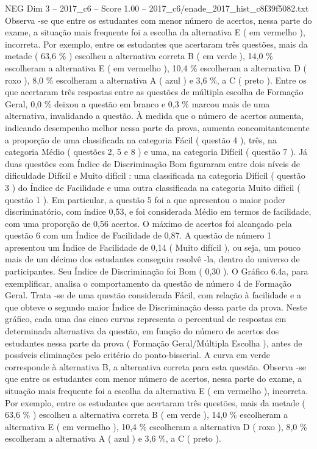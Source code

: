 \begin{textsample}{NEG Dim 3 – 2017\_c6 – Score 1.00 – 2017\_c6/enade\_2017\_hist\_c8f39f5082.txt}
Observa -se que entre os estudantes com menor número de acertos, nessa parte do exame, a situação mais frequente foi a escolha da alternativa E ( em vermelho ), incorreta.
Por exemplo, entre os estudantes que acertaram três questões, mais da metade ( 63,6 \% ) escolheu a alternativa correta B ( em verde ), 14,0 \% escolheram a alternativa E ( em vermelho ), 10,4 \% escolheram a alternativa D ( roxo ), 8,0 \% escolheram a alternativa A ( azul ) e 3,6 \%, a C ( preto ).
Entre os que acertaram três respostas entre as questões de múltipla escolha de Formação Geral, 0,0 \% deixou a questão em branco e 0,3 \% marcou mais de uma alternativa, invalidando a questão.
À medida que o número de acertos aumenta, indicando desempenho melhor nessa parte da prova, aumenta concomitantemente a proporção de uma classificada na categoria Fácil ( questão 4 ), três, na categoria Médio ( questões 2, 5 e 8 ) e uma, na categoria Difícil ( questão 7 ).
Já duas questões com Índice de Discriminação Bom figuraram entre dois níveis de dificuldade Difícil e Muito difícil : uma classificada na categoria Difícil ( questão 3 ) do Índice de Facilidade e uma outra classificada na categoria Muito difícil ( questão 1 ).
Em particular, a questão 5 foi a que apresentou o maior poder discriminatório, com índice 0,53, e foi considerada Médio em termos de facilidade, com uma proporção de 0,56 acertos.
O máximo de acertos foi alcançado pela questão 6 com um Índice de Facilidade de 0,87.
A questão de número 1 apresentou um Índice de Facilidade de 0,14 ( Muito difícil ), ou seja, um pouco mais de um décimo dos estudantes conseguiu resolvê -la, dentro do universo de participantes.
Seu Índice de Discriminação foi Bom ( 0,30 ).
O Gráfico 6.4a, para exemplificar, analisa o comportamento da questão de número 4 de Formação Geral.
Trata -se de uma questão considerada Fácil, com relação à facilidade e a que obteve o segundo maior Índice de Discriminação dessa parte da prova.
Neste gráfico, cada uma das cinco curvas representa o percentual de respostas em determinada alternativa da questão, em função do número de acertos dos estudantes nessa parte da prova ( Formação Geral/Múltipla Escolha ), antes de possíveis eliminações pelo critério do ponto-bisserial.
A curva em verde corresponde à alternativa B, a alternativa correta para esta questão.
Observa -se que entre os estudantes com menor número de acertos, nessa parte do exame, a situação mais frequente foi a escolha da alternativa E ( em vermelho ), incorreta.
Por exemplo, entre os estudantes que acertaram três questões, mais da metade ( 63,6 \% ) escolheu a alternativa correta B ( em verde ), 14,0 \% escolheram a alternativa E ( em vermelho ), 10,4 \% escolheram a alternativa D ( roxo ), 8,0 \% escolheram a alternativa A ( azul ) e 3,6 \%, a C ( preto ).

\end{textsample}
